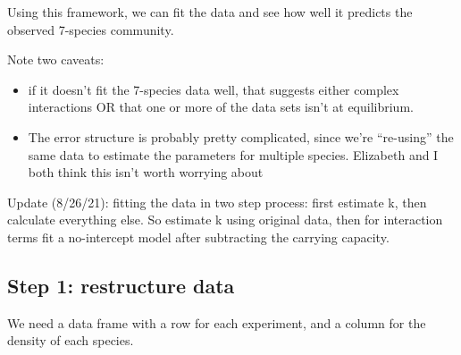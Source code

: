 \documentclass[
]{article}
\providecommand{\tightlist}{%
  \setlength{\itemsep}{0pt}\setlength{\parskip}{0pt}}
\begin{document}
Using this framework, we can fit the data and see how well it predicts
the observed 7-species community.

Note two caveats:

\begin{itemize}
\tightlist
\item
  if it doesn't fit the 7-species data well, that suggests either
  complex interactions OR that one or more of the data sets isn't at
  equilibrium.
\item
  The error structure is probably pretty complicated, since we're
  ``re-using'' the same data to estimate the parameters for multiple
  species. Elizabeth and I both think this isn't worth worrying about
\end{itemize}

Update (8/26/21): fitting the data in two step process: first estimate
k, then calculate everything else. So estimate k using original data,
then for interaction terms fit a no-intercept model after subtracting
the carrying capacity.

\hypertarget{step-1-restructure-data}{%
\subsection{Step 1: restructure data}\label{step-1-restructure-data}}

We need a data frame with a row for each experiment, and a column for
the density of each species.
\end{document}

